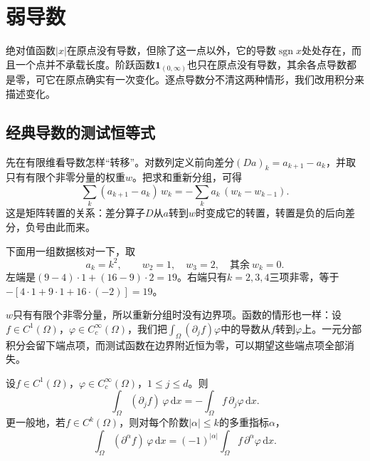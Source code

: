 \section{弱导数}
\label{sec:weakd-weak-derivatives}

绝对值函数$\lvert x\rvert$在原点没有导数，但除了这一点以外，它的导数$\operatorname{sgn}x$处处存在，而且一个点并不承载长度。阶跃函数$\mathbf 1_{(0,\infty)}$也只在原点没有导数，其余各点导数都是零，可它在原点确实有一次变化。逐点导数分不清这两种情形，我们改用积分来描述变化。

\subsection{经典导数的测试恒等式}
\label{sec:weakd-test-identity}

先在有限维看导数怎样“转移”。对数列定义前向差分$(Da)_k=a_{k+1}-a_k$，并取只有有限个非零分量的权重$w$。把求和重新分组，可得
\[
\sum_k(a_{k+1}-a_k)\,w_k=-\sum_ka_k\,(w_k-w_{k-1}).
\]
这是矩阵转置的关系：差分算子$D$从$a$转到$w$时变成它的转置，转置是负的后向差分，负号由此而来。

下面用一组数据核对一下，取
\[
a_k=k^2,\qquad w_2=1,\quad w_3=2,\quad\text{其余}\ w_k=0 .
\]
左端是$(9-4)\cdot1+(16-9)\cdot2=19$。右端只有$k=2,3,4$三项非零，等于$-[4\cdot1+9\cdot1+16\cdot(-2)]=19$。

$w$只有有限个非零分量，所以重新分组时没有边界项。函数的情形也一样：设$f\in C^1(\Omega)$，$\varphi\in C_c^\infty(\Omega)$，我们把$\int_\Omega(\partial_jf)\varphi$中的导数从$f$转到$\varphi$上。一元分部积分会留下端点项，而测试函数在边界附近恒为零，可以期望这些端点项全部消失。

\begin{lemma}[测试恒等式]
\label{lem:weakd-integration-by-parts}
设$f\in C^1(\Omega)$，$\varphi\in C_c^\infty(\Omega)$，$1\leq j\leq d$。则
\begin{equation}
\int_\Omega(\partial_jf)\,\varphi\,\mathrm dx=-\int_\Omega f\,\partial_j\varphi\,\mathrm dx .
\label{eq:weakd-integration-by-parts}
\end{equation}
更一般地，若$f\in C^k(\Omega)$，则对每个阶数$\lvert\alpha\rvert\leq k$的多重指标$\alpha$，
\begin{equation}
\int_\Omega(\partial^\alpha f)\,\varphi\,\mathrm dx=(-1)^{\lvert\alpha\rvert}\int_\Omega f\,\partial^\alpha\varphi\,\mathrm dx .
\label{eq:weakd-repeated-parts}
\end{equation}
\end{lemma}

